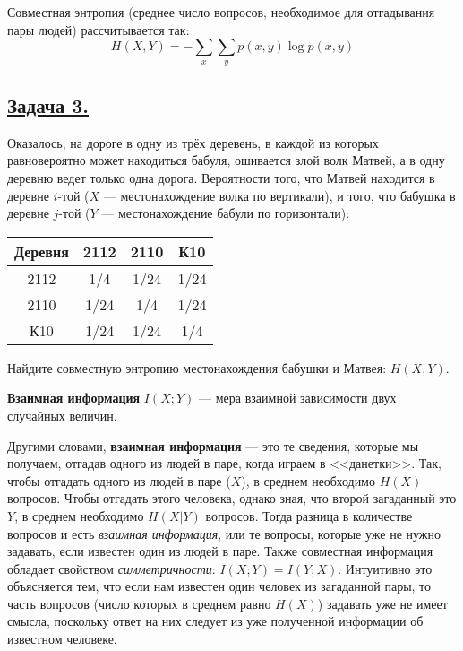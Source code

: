 Совместная энтропия (среднее число вопросов, необходимое для отгадывания пары людей) рассчитывается так:
\[H(X, Y)=-\sum\limits_{x}\sum\limits_{y} p(x, y)\log p(x ,y) \]

\subsection*{\hyperref[sec:sol_problem3]{Задача 3.}}\label{sec:problem3} Оказалось, на дороге в одну из трёх деревень, в каждой из которых равновероятно может находиться бабуля, ошивается злой волк Матвей, а в одну деревню ведет только одна дорога. Вероятности того, что Матвей находится в деревне $i$-той ($X$ --- местонахождение волка по вертикали), и того, что бабушка в деревне $j$-той ($Y$ --- местонахождение бабули по горизонтали):
\begin{center}
    \begin{tabular}{c||c|c|c}
        Деревня & 2112 & 2110 & К10 \\
        \hline
        \hline
        2112 & 1/4 & 1/24 & 1/24 \\
        \hline
        2110 & 1/24 & 1/4 & 1/24 \\
        \hline
        К10 & 1/24 & 1/24 & 1/4 \\
    \end{tabular}
\end{center}

Найдите совместную энтропию местонахождения бабушки и Матвея: $H(X, Y)$. \\


\begin{siderules}
    \textbf{Взаимная информация} $I(X; Y)$ --- мера взаимной зависимости двух случайных величин.
\end{siderules}

Другими словами, \textbf{взаимная информация} --- это те сведения, которые мы получаем, отгадав одного из людей в паре, когда играем в <<данетки>>. Так, чтобы отгадать одного из людей в паре ($X$), в среднем необходимо $H(X)$ вопросов. Чтобы отгадать этого человека, однако зная, что второй загаданный это $Y$, в среднем необходимо $H(X|Y)$ вопросов. Тогда разница в количестве вопросов и есть \textit{взаимная информация}, или те вопросы, которые уже не нужно задавать, если известен один из людей в паре. Также совместная информация обладает свойством \textit{симметричности}: $I(X;Y)=I(Y;X)$. Интуитивно это объясняется тем, что если нам известен один человек из загаданной пары, то часть вопросов (число которых в среднем равно $H(X)$) задавать уже не имеет смысла, поскольку ответ на них следует из уже полученной информации об известном человеке. 

